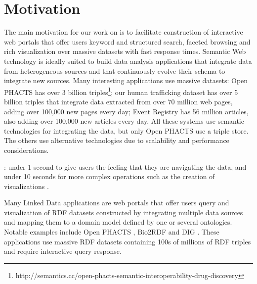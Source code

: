 \section{Motivation}
\label{sec:motivation}
The main motivation for our work on \ldviews is to facilitate construction of interactive web portals that offer users keyword and structured search, faceted browsing and rich visualization over massive datasets with fast response times.
Semantic Web technology is ideally suited to build data analysis applications that integrate data from heterogeneous sources and that continuously evolve their schema to integrate new sources.
Many interesting applications use massive datasets: 
Open PHACTS has over 3 billion triples\footnote{http://semantics.cc/open-phacts-semantic-interoperability-drug-discovery};
our human trafficking dataset has over 5 billion triples that integrate data extracted from over 70 million web pages, adding over 100,000 new pages every day;
Event Registry has 56 million articles, also adding over 100,000 new articles every day.
All these systems use semantic technologies for integrating the data, but only Open PHACTS use a triple store.
The others use alternative technologies due to scalability and performance considerations.



:  under 1 second to give users the feeling that they are navigating the data, and under 10 seconds for more complex operations such as the creation of visualizations \cite{nielsen1994usability}.

Many Linked Data applications are web portals that offer users query and visualization of RDF datasets constructed by integrating multiple data sources and mapping them to a domain model defined by one or several ontologies.
Notable examples include Open PHACTS \cite{Groth_Loizou_Gray_Goble_Harland_Pettifer_2014}, Bio2RDF \cite{callahan2013bio2rdf} and DIG \cite{szekely2015building}.
These applications use massive RDF datasets containing 100s of millions of RDF triples and require interactive query response.